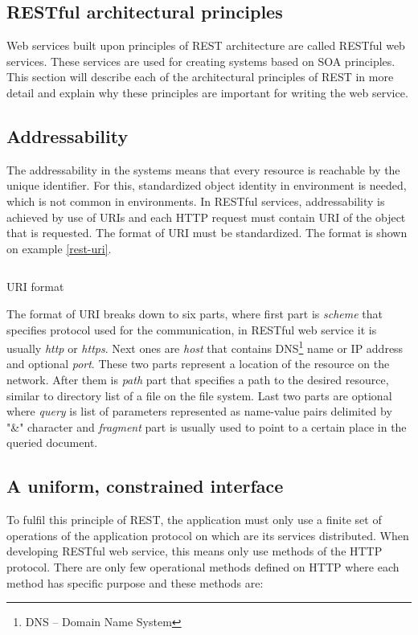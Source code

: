 \documentclass[12pt,final,oneside]{fithesis2}
\begin{document}
\subsection{RESTful architectural principles}
Web services built upon principles of REST architecture are called RESTful web services. These services are used for creating systems based on SOA principles. This section will describe each of the architectural principles of REST in more detail and explain why these principles are important for writing the web service.


\subsection*{Addressability}
The addressability in the systems means that every resource is reachable by the unique identifier. For this, standardized object identity in environment is needed, which is not common in environments. In RESTful services, addressability is achieved by use of URIs and each HTTP request must contain URI of the object that is requested. The format of URI must be standardized. The format is shown on example \ref{rest-uri}.

\begin{listing}[ht]
	\inputminted[]{bash}{sources/rest-uri.java}
	\caption{URI format}
	\label{rest-uri}
\end{listing}

The format of URI breaks down to six parts, where first part is \textit{scheme} that specifies protocol used for the communication, in RESTful web service it is usually \textit{http} or \textit{https}. Next ones are \textit{host} that contains DNS\footnote{DNS -- Domain Name System} name or IP address and optional \textit{port}. These two parts represent a location of the resource on the network. After them is \textit{path} part that specifies a path to the desired resource, similar to directory list of a file on the file system. Last two parts are optional where \textit{query} is list of parameters represented as name-value pairs delimited by "\&" character and \textit{fragment} part is usually used to point to a certain place in the queried document.

\subsection*{A uniform, constrained interface}
To fulfil this principle of REST, the application must only use a finite set of operations of the application protocol on which are its services distributed. When developing RESTful web service, this means only use methods of the HTTP protocol. There are only few operational methods defined on HTTP where each method has specific purpose and these methods are:
\end{document}
